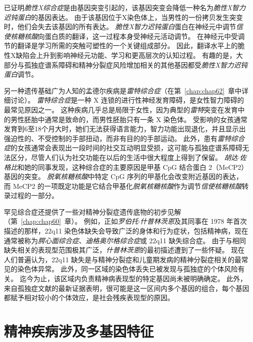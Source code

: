 已证明\textit{脆性X综合症}是由基因突变引起的，该基因突变会降低一种名为\textit{脆性X智力迟钝蛋白}的基因表达。
由于该基因位于X染色体上，当男性的一份拷贝发生突变时，他们会失去该基因的所有表达。
\textit{脆性X智力迟钝蛋白}蛋白在神经元中调节\textit{信使核糖核酸}向蛋白质的翻译，这一过程本身受神经元活动调节。
在神经元中受调节的翻译是学习所需的突触可塑性的一个关键组成部分。
因此，翻译水平上的脆性X缺陷会上升到影响神经元功能、学习和更高层次的认知过程。
有趣的是，大部分与孤独症谱系障碍和精神分裂症风险增加相关的其他基因都受\textit{脆性X智力迟钝蛋白}调节。


另一种遗传基础广为人知的孟德尔疾病是\textit{雷特综合症}（在第~\ref{chap:chap62}~章中详细讨论）。
\textit{雷特综合症}是一种 X 连锁的进行性神经发育障碍，是女性智力障碍的最常见原因之一。
这种疾病几乎总是局限于女性，因为典型的\textit{雷特}突变在发育中的男性胚胎中通常是致命的，而男性胚胎只有一条 X 染色体。
受影响的女孩通常发育到6至18个月大时，她们无法获得语言能力，智力功能出现退化，并且显示出强迫性的、不受控制的手部扭动，而非有目的的手部运动。
此外，患有\textit{雷特综合症}的女孩通常会表现出一段时间的社交互动明显受损，这可能与孤独症谱系障碍无法区分，尽管人们认为社交功能在以后的生活中很大程度上得到了保留。
\textit{胡达$\cdot$佐格比}和她的同事发现，这种综合症的主要原因是甲基 CpG 结合蛋白 2（MeCP2）基因的突变。
\textit{脱氧核糖核酸}中特定 CpG 序列的甲基化会改变附近基因的表达，而 MeCP2 的一项既定功能是它结合甲基化\textit{脱氧核糖核酸}作为调节\textit{信使核糖核酸}转录过程的一部分。



罕见综合症还提供了一些对精神分裂症遗传底物的初步见解（第~\ref{chap:chap60}~章）。
例如，正如\textit{罗伯托$\cdot$什普林茨恩}及其同事在 1978 年首次描述的那样，22q11 染色体缺失会导致广泛的身体和行为症状，包括精神病，现在通常被称为\textit{腭心面综合症}、\textit{迪格奥尔格综合症}或 22q11 缺失综合症。
由于与相同缺失相关的表现型范围极其广泛，\textit{什普林茨恩}的最初描述遭到了一些怀疑。
现在人们普遍认为，22q11 缺失是与精神分裂症和儿童期发病的精神分裂症相关的最常见的染色体异常。
此外，同一区域的染色体丢失已被发现与孤独症的个体风险有关。
迄今为止，该区域内负责精神病表现型的特定基因尚未被明确确定。
此外，来自孤独症文献的最新证据表明，很可能是这一区间内多个基因的组合，每个基因都赋予相对较小的个体效应，是社会残疾表现型的原因。



\section{精神疾病涉及多基因特征}

